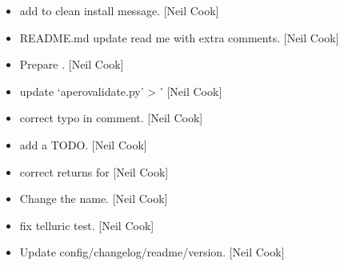 \documentclass[a4paper,10pt,english]{report}
\begin{document}
\begin{itemize}
\item {} 
 \sphinxhyphen{}  \sphinxhyphen{} add to clean install
message. {[}Neil Cook{]}

\item {} 
README.md \sphinxhyphen{} update read me with extra comments. {[}Neil Cook{]}

\item {} 
Prepare . {[}Neil Cook{]}

\item {} 
 \sphinxhyphen{} update ‘apero\sphinxhyphen{}validate.py’
\textendash{}\textgreater{} ’ {[}Neil Cook{]}

\item {} 
 \sphinxhyphen{} correct typo in comment. {[}Neil
Cook{]}

\item {} 
 \sphinxhyphen{} add a TODO. {[}Neil Cook{]}

\item {} 
 \sphinxhyphen{} correct returns for
 {[}Neil Cook{]}

\item {} 
Change the  name. {[}Neil Cook{]}

\item {} 
 \sphinxhyphen{} fix telluric test. {[}Neil Cook{]}

\item {} 
Update config/changelog/readme/version. {[}Neil Cook{]}

\end{itemize}
\end{document}
